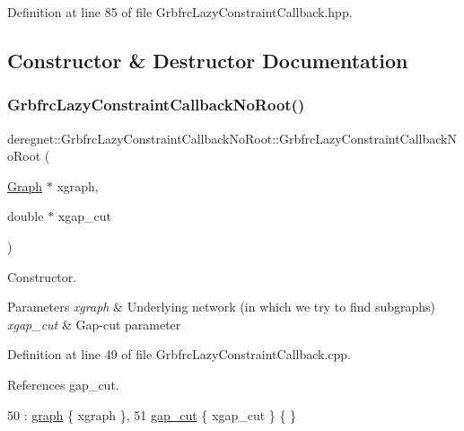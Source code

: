 Definition at line 85 of file Grbfrc\+Lazy\+Constraint\+Callback.\+hpp.



\subsection{Constructor \& Destructor Documentation}
\mbox{\label{classderegnet_1_1GrbfrcLazyConstraintCallbackNoRoot_a89ebb5a3dfa9156849b68adf27d86c02}} 
\subsubsection{\texorpdfstring{Grbfrc\+Lazy\+Constraint\+Callback\+No\+Root()}{GrbfrcLazyConstraintCallbackNoRoot()}}
{\footnotesize\ttfamily deregnet\+::\+Grbfrc\+Lazy\+Constraint\+Callback\+No\+Root\+::\+Grbfrc\+Lazy\+Constraint\+Callback\+No\+Root (\begin{DoxyParamCaption}\item[{\hyperlink{namespacederegnet_a55b76c55bbabc682cbc61f8b9948799e}{Graph} $\ast$}]{xgraph,  }\item[{double $\ast$}]{xgap\+\_\+cut }\end{DoxyParamCaption})}



Constructor. 


\begin{DoxyParams}{Parameters}
{\em xgraph} & Underlying network (in which we try to find subgraphs) \\
\hline
{\em xgap\+\_\+cut} & Gap-\/cut parameter \\
\hline
\end{DoxyParams}


Definition at line 49 of file Grbfrc\+Lazy\+Constraint\+Callback.\+cpp.



References gap\+\_\+cut.


\begin{DoxyCode}
50     : \hyperlink{classderegnet_1_1GrbfrcLazyConstraintCallbackNoRoot_a0c5b7bfa966879cc74fea0ea1c5c864c}{graph} \{ xgraph \},
51       \hyperlink{classderegnet_1_1GrbfrcLazyConstraintCallbackNoRoot_ac8425029e6bb6929bc08c261f203cccf}{gap\_cut} \{ xgap\_cut \} \{ \}
\end{DoxyCode}


